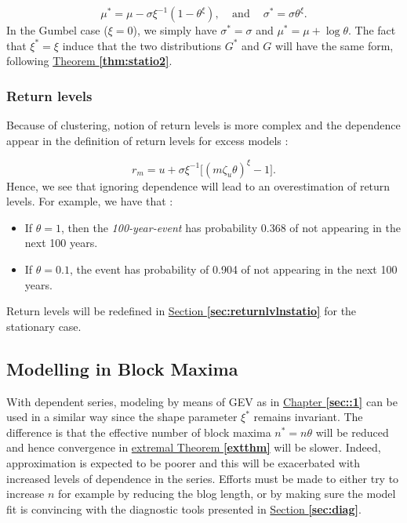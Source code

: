 \begin{equation}
\mu^* = \mu-\sigma\xi^{-1}(1-\theta^{\xi}), \ \ \ \   \ \text{and} \ \quad \sigma^*=\sigma\theta^{\xi}.
\end{equation}
In the Gumbel case ($\xi=0$), we simply have $\sigma^*=\sigma$ and $\mu^*=\mu+\log\theta$.
The fact that $\xi^*=\xi$ induce that the two distributions $G^*$ and $G$ will have the same form, following \hyperref[thm:statio2]{Theorem \textbf{\ref{thm:statio2}}}.




\subsubsection*{Return levels}

Because of clustering, notion of return levels is more complex and the dependence appear in the definition of return levels for excess models :

\begin{equation}\label{eq:rlstatio}
r_m = u + \sigma\xi^{-1}\Big[(m\zeta_u\theta)^{\xi}-1\Big].
\end{equation}
Hence, we see that ignoring dependence will lead to an overestimation of return levels. For example, we have that :

\begin{itemize}
	\item If $\theta=1$, then the \textit{100-year-event} has probability 0.368 of not appearing in the next 100 years.
	\item If $\theta=0.1$, the event has probability of 0.904 of not appearing in the next 100 years.
\end{itemize}
Return levels will be redefined in \hyperref[sec:returnlvlnstatio]{Section \textbf{\ref{sec:returnlvlnstatio}}} for the stationary case.

\subsection{Modelling in Block Maxima}

With dependent series, modeling by means of GEV as in 
\hyperref[sec::1]{Chapter \textbf{\ref{sec::1}}} can be used in 
a similar way since the shape parameter $\xi^*$ remains invariant. The difference is that the effective number of block maxima $n^*=n\theta$ will be reduced and hence convergence in \hyperref[extthm]{extremal Theorem \textbf{\ref{extthm}}} will be slower. 
Indeed, approximation is expected to be poorer and this will be exacerbated with increased levels of dependence in the series.
Efforts must be made to either try to increase $n$ for example by reducing the blog length, or by making sure the model fit is convincing with the diagnostic tools presented in \hyperref[sec:diag]{Section \textbf{\ref{sec:diag}}}.


